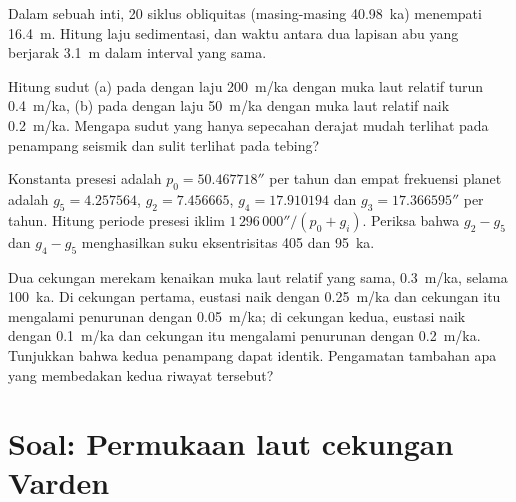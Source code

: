 \begin{exercise}[$\star\star$]\label{exo:b3:sequence-stratigraphy:9}
Dalam sebuah inti, 20 siklus obliquitas (masing-masing \qty{40.98}{ka}) menempati
\qty{16.4}{m}. Hitung laju sedimentasi, dan waktu antara dua lapisan abu yang
berjarak \qty{3.1}{m} dalam interval yang sama.
\end{exercise}

\begin{exercise}[$\star\star\star$]\label{exo:b3:sequence-stratigraphy:10}
Hitung sudut  (a) pada  dengan laju \qty{200}{m/ka}
dengan muka laut relatif turun \qty{0.4}{m/ka}, (b) pada  dengan laju
\qty{50}{m/ka} dengan muka laut relatif naik \qty{0.2}{m/ka}. Mengapa sudut yang hanya
sepecahan derajat mudah terlihat pada
penampang seismik dan sulit terlihat pada tebing?
\end{exercise}

\begin{exercise}[$\star\star\star$]\label{exo:b3:sequence-stratigraphy:11}
Konstanta presesi adalah $p_0 = 50.467718''$ per tahun dan empat frekuensi planet
adalah $g_5 = 4.257564$, $g_2 = 7.456665$, $g_4 = 17.910194$ dan
$g_3 = 17.366595''$ per tahun. Hitung periode presesi iklim
$1\,296\,000''/(p_0 + g_i)$. Periksa bahwa $g_2 - g_5$ dan $g_4 - g_5$ menghasilkan
suku eksentrisitas 405 dan \qty{95}{ka}.
\end{exercise}

\begin{exercise}[$\star\star\star$]\label{exo:b3:sequence-stratigraphy:12}
Dua cekungan merekam kenaikan muka laut relatif yang sama, \qty{0.3}{m/ka}, selama
\qty{100}{ka}. Di cekungan pertama, eustasi naik dengan \qty{0.25}{m/ka} dan cekungan
itu mengalami penurunan dengan \qty{0.05}{m/ka}; di cekungan kedua, eustasi naik dengan
\qty{0.1}{m/ka} dan cekungan itu mengalami penurunan dengan \qty{0.2}{m/ka}. Tunjukkan bahwa kedua
penampang dapat identik. Pengamatan tambahan apa yang membedakan
kedua riwayat tersebut?
\end{exercise}

\section{Soal: Permukaan laut cekungan Varden}

